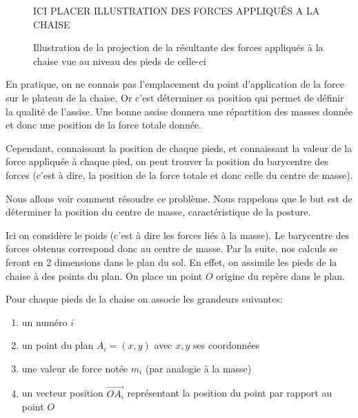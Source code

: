 \documentclass{polytech/polytech}
\begin{document}



\begin{figure}[htbp]
ICI PLACER ILLUSTRATION DES FORCES APPLIQU\'ES A LA CHAISE
\caption{Illustration de la projection de la résultante des forces appliqués à la chaise vue au niveau des pieds de celle-ci}
\label{fig:illustr_chaise_forces}
\end{figure}

En pratique, on ne connais pas l'emplacement du point d'application de la force sur le plateau de la chaise. Or c'est déterminer sa position qui permet de définir la qualité de l'assise. Une bonne assise donnera une répartition des masses donnée et donc une position de la force totale donnée.


Cependant, connaissant la position de chaque pieds, et connaissant la valeur de la force appliquée à chaque pied, on peut trouver la position du barycentre des forces (c'est à dire, la position de la force totale et donc celle du centre de masse). 

Nous allons voir comment résoudre ce problème. Nous rappelons que le but est de déterminer la position du centre de masse, caractéristique de la posture.

Ici on considère le poids (c'est à dire les forces liés à la masse). Le barycentre des forces obtenus correspond donc au centre de masse. 
Par la suite, nos calculs se feront en 2 dimensions dans le plan du sol. En effet, on assimile les pieds de la chaise à des points du plan. On place un point $O$ origine du repère dans le plan. 

Pour chaque pieds de la chaise on associe les grandeurs suivantes:

\begin{enumerate}
\item un numéro $i$
\item un point du plan $A_i=(x,y)$ avec $x,y$ ses coordonnées
\item une valeur de force notée $m_i$ (par analogie à la masse)
\item un vecteur position $\vec{OA_i}$ représentant la position du point par rapport au point $O$
\end{enumerate}
\end{document}
